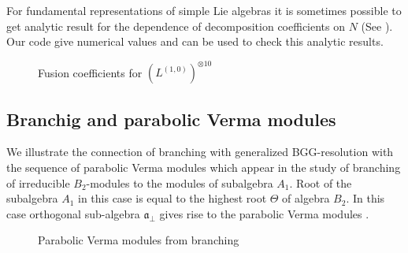 \documentclass[preprint,12pt]{elsarticle}
\newcommand{\afb}{\mathfrak{a}_{\bot}}
\begin{document}
For fundamental representations of simple Lie algebras it is sometimes possible to get analytic result for the dependence of decomposition coefficients on $N$ (See \cite{LyakhovskyPostnova2011}). Our code give numerical values and can be used to check this analytic results.

\begin{figure}[h]
  \label{tensor-product-decomposition-b2}
  \noindent{}
  \caption{Fusion coefficients for $\left(L^{(1,0)}\right)^{\otimes 10}$}
\end{figure}

\subsection{Branchig and parabolic Verma modules}
\label{sec:branch-parab-verma}

We illustrate the connection of branching with generalized BGG-resolution with the sequence of parabolic Verma modules which appear in the study of branching of irreducible $B_{2}$-modules to the modules of subalgebra $A_{1}$. Root of the subalgebra $A_{1}$ in this case is equal to the highest root $\Theta$ of algebra $B_{2}$. In this case orthogonal sub-algebra $\afb$ gives rise to the parabolic Verma modules \cite{2011arXiv1102.1702L}.

\begin{figure}[h]
  \label{branching-bgg}
  \noindent{}
  \caption{Parabolic Verma modules from branching}
\end{figure}
\end{document}
